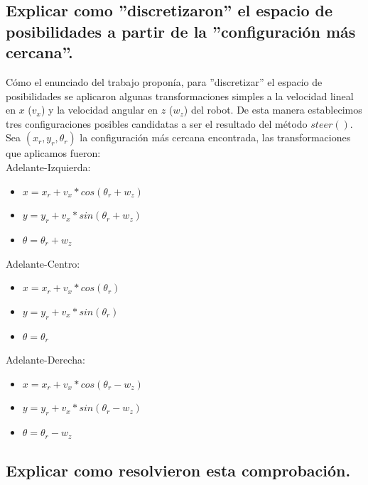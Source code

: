 \documentclass[a4paper]{article}
\theoremstyle{plain}
\theoremstyle{remark}
\theoremstyle{definition}
\begin{document}
\subsection{Explicar como ”discretizaron” el espacio de posibilidades a partir
de la ”configuración más cercana”.}

Cómo el enunciado del trabajo proponía, para ”discretizar” el espacio de posibilidades se aplicaron algunas transformaciones simples a la velocidad lineal en $x$ ($v_x$) y la velocidad angular en $z$ ($w_z$) del robot. De esta manera establecimos tres configuraciones posibles candidatas a ser el resultado del método $steer()$. \\

Sea $(x_r, y_r, \theta_r)$ la configuración más cercana encontrada, las transformaciones que aplicamos fueron: \\

Adelante-Izquierda: \\

\begin{itemize}
  \item{$x = x_r + v_x * cos(\theta_r + w_z)$}
  \item{$y = y_r + v_x * sin(\theta_r + w_z)$}
  \item{$\theta = \theta_r + w_z$}
\end{itemize}

Adelante-Centro: \\

\begin{itemize}
  \item{$x = x_r + v_x * cos(\theta_r)$}
  \item{$y = y_r + v_x * sin(\theta_r)$}
  \item{$\theta = \theta_r$}
\end{itemize}

Adelante-Derecha: \\

\begin{itemize}
  \item{$x = x_r + v_x * cos(\theta_r - w_z)$}
  \item{$y = y_r + v_x * sin(\theta_r - w_z)$}
  \item{$\theta = \theta_r - w_z$}
\end{itemize}

\subsection{Explicar como resolvieron esta comprobación.}
\end{document}
